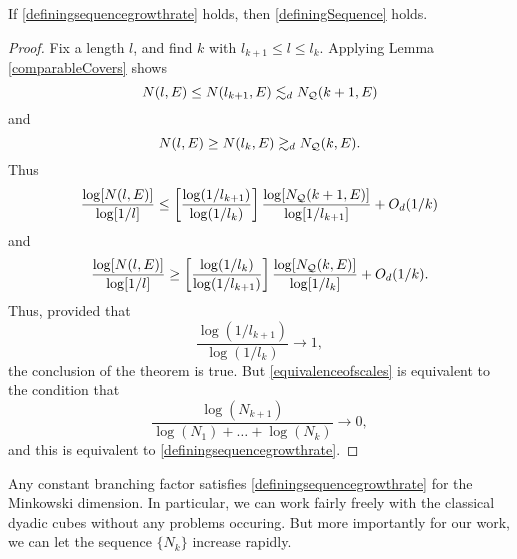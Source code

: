 \begin{lemma} \label{definingsequenceminkowski}
	If \eqref{definingsequencegrowthrate} holds, then \eqref{definingSequence} holds.
\end{lemma}
\begin{proof}
	Fix a length $l$, and find $k$ with $l_{k+1} \leq l \leq l_k$. Applying Lemma \ref{comparableCovers} shows
	\[ N(l,E) \leq N(l_{k+1},E) \lesssim_d N_{\operatorname{\mathcal{Q}}}(k+1,E) \]
	and
	\[ N(l,E) \geq N(l_k,E) \gtrsim_d N_{\operatorname{\mathcal{Q}}}(k,E). \]
	Thus
	\[ \frac{\log[N(l,E)]}{\log[1/l]} \leq \left[ \frac{\log(1/l_{k+1})}{\log(1/l_k)} \right] \frac{\log[N_{\operatorname{\mathcal{Q}}}(k+1,E)]}{\log[1/l_{k+1}]} + O_d(1/k) \]
	and
	\[ \frac{\log[N(l,E)]}{\log[1/l]} \geq \left[ \frac{\log(1/l_k)}{\log(1/l_{k+1})} \right] \frac{\log[N_{\operatorname{\mathcal{Q}}}(k,E)]}{\log[1/l_k]} + O_d(1/k). \]
	Thus, provided that
	\begin{equation} \label{equivalenceofscales}
		\frac{\log(1/l_{k+1})}{\log(1/l_k)} \to 1,
	\end{equation}
	the conclusion of the theorem is true. But \eqref{equivalenceofscales} is equivalent to the condition that
	\[ \frac{\log(N_{k+1})}{\log(N_1) + \dots + \log(N_k)} \to 0, \]
	and this is equivalent to \eqref{definingsequencegrowthrate}.
\end{proof}

Any constant branching factor satisfies \ref{definingsequencegrowthrate} for the Minkowski dimension. In particular, we can work fairly freely with the classical dyadic cubes without any problems occuring. But more importantly for our work, we can let the sequence $\{ N_k \}$ increase rapidly.

